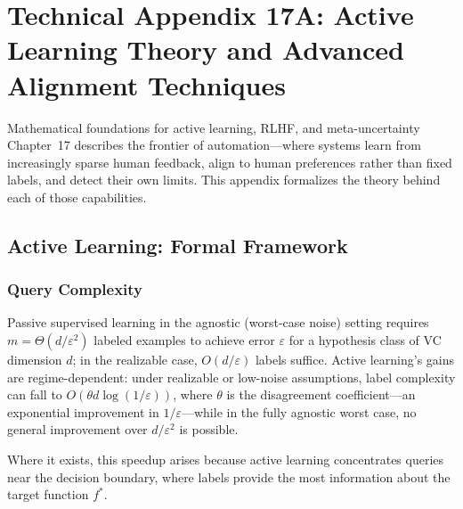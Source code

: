 
\chapter*{Technical Appendix 17A: Active Learning Theory and Advanced Alignment Techniques}

\begin{chapterquote}{Mathematical foundations for active learning, RLHF, and meta-uncertainty}
Chapter~17 describes the frontier of automation---where systems learn from increasingly sparse human feedback, align to human preferences rather than fixed labels, and detect their own limits. This appendix formalizes the theory behind each of those capabilities.
\end{chapterquote}

\apxnumon
\section{Active Learning: Formal Framework}
\label{sec:a17-active-learning}

\subsection{Query Complexity}

Passive supervised learning in the agnostic (worst-case noise) setting requires $m = \Theta(d / \varepsilon^2)$ labeled examples to achieve error $\varepsilon$ for a hypothesis class of VC dimension $d$; in the realizable case, $O(d / \varepsilon)$ labels suffice. Active learning's gains are regime-dependent: under realizable or low-noise assumptions, label complexity can fall to $O(\theta d \log(1 / \varepsilon))$, where $\theta$ is the disagreement coefficient---an exponential improvement in $1 / \varepsilon$---while in the fully agnostic worst case, no general improvement over $d / \varepsilon^2$ is possible.

Where it exists, this speedup arises because active learning concentrates queries near the decision boundary, where labels provide the most information about the target function $f^*$.

